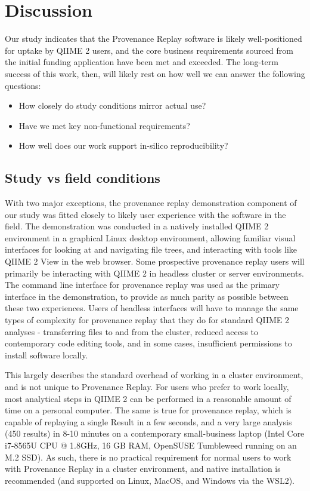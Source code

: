 \chapter{Discussion}

Our study indicates that the Provenance Replay software is likely
well-positioned for uptake by QIIME 2 users, and the core business requirements
sourced from the initial funding application have been met and exceeded. The
long-term success of this work, then, will likely rest on how well we can answer
the following questions:

\begin{itemize}
    \item How closely do study conditions mirror actual use?
    \item Have we met key non-functional requirements?
    \item How well does our work support in-silico reproducibility?
\end{itemize}

\section{Study vs field conditions}

With two major exceptions, the provenance replay demonstration component of our
study was fitted closely to likely user experience with the software in the
field. The demonstration was conducted in a natively installed QIIME 2
environment in a graphical Linux desktop environment, allowing familiar visual
interfaces for looking at and navigating file trees, and interacting with tools
like QIIME 2 View in the web browser. Some prospective provenance replay users will
primarily be interacting with QIIME 2 in headless cluster or server
environments. The command line interface for provenance replay was used as the
primary interface in the demonstration, to provide as much parity as possible
between these two experiences. Users of headless interfaces will have to manage
the same types of complexity for provenance replay that they do for standard
QIIME 2 analyses - transferring files to and from the cluster, reduced access to
contemporary code editing tools, and in some cases, insufficient permissions to
install software locally. 

This largely describes the standard overhead of working in a cluster
environment, and is not unique to Provenance Replay. For users who prefer to
work locally, most analytical steps in QIIME 2 can be performed in a reasonable
amount of time on a personal computer. The same is true for provenance replay,
which is capable of replaying a single Result in a few seconds, and a very large
analysis (450 results) in 8-10 minutes on a contemporary small-business laptop
(Intel Core i7-8565U CPU @ 1.8GHz, 16 GB RAM, OpenSUSE Tumbleweed running on an
M.2 SSD). As such, there is no practical requirement for normal users to work
with Provenance Replay in a cluster environment, and native installation is
recommended (and supported on Linux, MacOS, and Windows via the WSL2).

